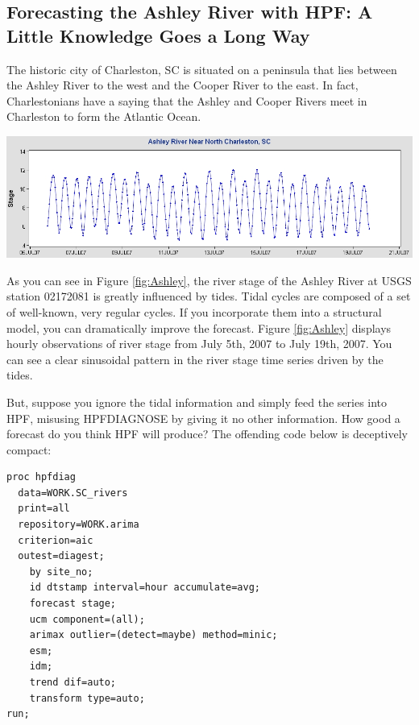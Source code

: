 \documentclass[10pt]{sugconf-ish}
\begin{document}
\subsection{Forecasting the Ashley River with HPF: A Little Knowledge Goes a Long Way}
The historic city of Charleston, SC is situated on a peninsula that lies between the Ashley River to the west and the Cooper River to the east. In fact, Charlestonians have a saying that the Ashley and Cooper Rivers meet in Charleston to form the Atlantic Ocean.

\begin{minipage}{\linewidth} 
\centering
\includegraphics[width=6in,keepaspectratio]{AshleyData.jpg} 
\label{fig:Ashley}
\end{minipage} 

As you can see in Figure \ref{fig:Ashley}, the river stage of the Ashley River at USGS station 02172081 is greatly influenced by tides. Tidal cycles are composed of a set of well-known, very regular cycles. If you incorporate them into a structural model, you can dramatically improve the forecast. Figure \ref{fig:Ashley} displays hourly observations of river stage from July 5th, 2007 to July 19th, 2007. You can see a clear sinusoidal pattern in the river stage time series driven by the tides.

But, suppose you ignore the tidal information and simply feed the series into HPF, misusing HPFDIAGNOSE by giving it no other information. How good a forecast do you think HPF will produce? The offending code below is deceptively compact:

\small
\begin{verbatim}
proc hpfdiag
  data=WORK.SC_rivers
  print=all
  repository=WORK.arima 
  criterion=aic
  outest=diagest;
    by site_no;
    id dtstamp interval=hour accumulate=avg;
    forecast stage;
    ucm component=(all);
    arimax outlier=(detect=maybe) method=minic;
    esm;
    idm;
    trend dif=auto;
    transform type=auto;
run;
\end{verbatim}
\normalsize
\end{document}
